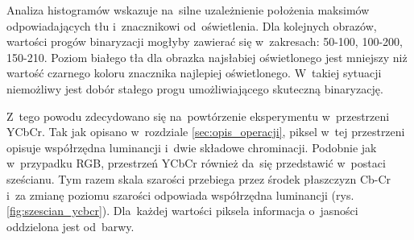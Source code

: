 Analiza histogramów wskazuje na~silne uzależnienie położenia maksimów odpowiadających tłu i~znacznikowi od~oświetlenia.  %
Dla kolejnych obrazów, wartości progów binaryzacji mogłyby zawierać się w~zakresach: 50-100, 100-200, 150-210. Poziom białego tła dla obrazka najsłabiej oświetlonego jest mniejszy niż wartość czarnego koloru znacznika najlepiej oświetlonego. 
W~takiej sytuacji niemożliwy jest dobór stałego progu umożliwiającego skuteczną binaryzację.

Z~tego powodu zdecydowano się na~powtórzenie eksperymentu w~przestrzeni YCbCr. 
Tak jak opisano w~rozdziale \ref{sec:opis_operacji}, piksel w~tej przestrzeni opisuje współrzędna luminancji i~dwie składowe chrominacji. 
Podobnie jak w~przypadku RGB, przestrzeń YCbCr również da~się przedstawić w~postaci sześcianu. 
Tym razem skala szarości przebiega przez środek płaszczyzn Cb-Cr i~za zmianę poziomu szarości odpowiada współrzędna luminancji (rys. \ref{fig:szescian_ycbcr}). 
Dla~każdej wartości piksela informacja o~jasności oddzielona jest od~barwy.

